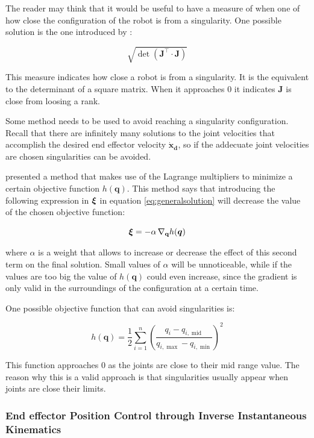 The reader may think that it would be useful to have a measure of when one of how close the configuration of the robot is from a singularity. One possible solution is the one introduced by \cite{yoshikawa1985dynamic}:

$$\sqrt{\operatorname{det}(\mathbf{J^{\intercal}} \cdot \mathbf{J})}$$

This measure indicates how close a robot is from a singularity. It is the equivalent to the determinant of a square matrix. When it approaches 0 it indicates $\mathbf{J}$ is close from loosing a rank.

Some method needs to be used to avoid reaching a singularity configuration. Recall that there are infinitely many solutions to the joint velocities that accomplish the desired end effector velocity $\mathbf{\dot{x}_{d}}$, so if the addecuate joint velocities are chosen singularities can be avoided.

\cite{liegeois1977automatic} presented a method that makes use of the Lagrange multipliers to minimize a certain objective function $h(\boldsymbol{q})$. This method says that introducing the following expression in $\mbox{\boldmath$\xi$}$ in equation \ref{eq:generalsolution} will decrease the value of the chosen objective function:

$$
\mbox{\boldmath$\xi$} = - \alpha \, \nabla_{\mathbf{q}} h(\boldsymbol{q})
$$

where $\alpha$ is a weight that allows to increase or decrease the effect of this second term on the final solution. Small values of $\alpha$ will be unnoticeable, while if the values are too big the value of $h(\boldsymbol{q})$ could even increase, since the gradient is only valid in the surroundings of the configuration at a certain time.

One possible objective function that can avoid singularities is:

$$
h(\boldsymbol{q})=\frac{1}{2} \sum_{i=1}^{n}\left(\frac{q_{i}-q_{i, \operatorname{mid}}}{q_{i, \max }-q_{i, \min }}\right)^{2}
$$

This function approaches $0$ as the joints are close to their mid range value. The reason why this is a valid approach is that singularities usually appear when joints are close their limits.



\subsubsection{End effector Position Control through Inverse Instantaneous Kinematics}
\label{sss:eepositioncontrol}

